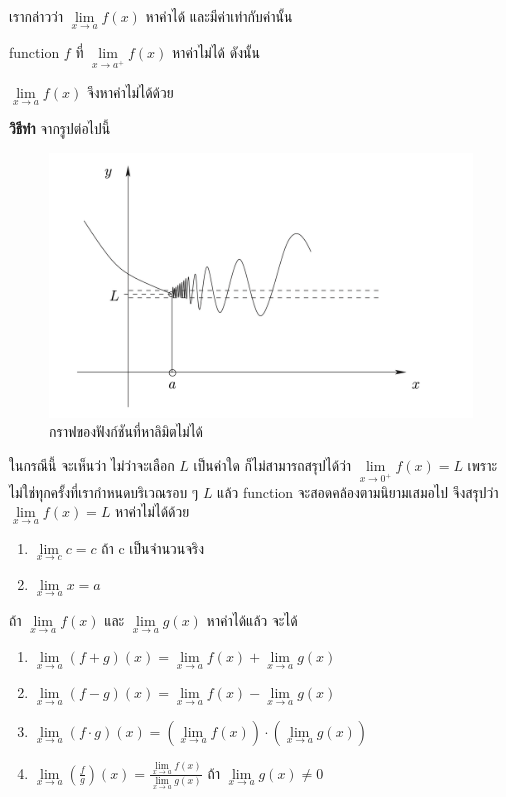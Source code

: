 \documentclass[
]{book}
\begin{document}
เรากล่าวว่า \(\underset{x\rightarrow a}{\lim}f(x)\) หาค่าได้ และมีค่าเท่ากับค่านั้น

\label{ex-limit-2}
function \(f\) ที่ \(\underset{x\rightarrow a^{+}}{\lim}f(x)\) หาค่าไม่ได้
ดังนั้น

\(\underset{x\rightarrow a}{\lim}f(x)\) จึงหาค่าไม่ได้ด้วย

\textbf{วิธีทำ} จากรูปต่อไปนี้

\begin{figure}

{\centering \includegraphics[width=0.5\linewidth]{images/fig-limit-1} 

}

\caption{กราฟของฟังก์ชันที่หาลิมิตไม่ได้}\label{fig:fig-limit-1}
\end{figure}

ในกรณีนี้ จะเห็นว่า ไม่ว่าจะเลือก \(L\) เป็นค่าใด ก็ไม่สามารถสรุปได้ว่า
\(\underset{x\rightarrow 0^{+}}{\lim}f(x)=L\)
เพราะไม่ใช่ทุกครั้งที่เรากำหนดบริเวณรอบ ๆ \(L\) แล้ว function
จะสอดคล้องตามนิยามเสมอไป จึงสรุปว่า \(\underset{x\rightarrow a}{\lim}f(x)=L\)
หาค่าไม่ได้ด้วย

\label{thm-limit-1}
\begin{enumerate}
\def\labelenumi{\arabic{enumi}.}
\item
  \(\underset{x\rightarrow c}{\lim}c=c\) ถ้า c เป็นจำนวนจริง
\item
  \(\underset{x\rightarrow a}{\lim}x=a\)
\end{enumerate}

\label{thm-limit-2}
ถ้า \(\underset{x\rightarrow a}{\lim}f(x)\) และ
\(\underset{x\rightarrow a}{\lim}g(x)\) หาค่าได้แล้ว จะได้

\begin{enumerate}
\def\labelenumi{\arabic{enumi}.}
\item
  \(\underset{x\rightarrow a}{\lim}(f+g)(x)=\underset{x\rightarrow a}{\lim}f(x)+\underset{x\rightarrow a}{\lim}g(x)\)
\item
  \(\underset{x\rightarrow a}{\lim}(f-g)(x)=\underset{x\rightarrow a}{\lim}f(x)-\underset{x\rightarrow a}{\lim}g(x)\)
\item
  \(\underset{x\rightarrow a}{\lim}(f\cdot g)(x)=\left( \underset{x\rightarrow a}{\lim}f(x)\right) \cdot \left( \underset{x\rightarrow a}{\lim}g(x)\right)\)
\item
  \(\underset{x\rightarrow a}{\lim}\left( \frac{f}{g}\right) (x)=\frac{\underset{x\rightarrow a}{\lim}f(x)}{\underset{x\rightarrow a}{\lim}g(x)}\)
  ถ้า \(\underset{x\rightarrow a}{\lim}g(x)\neq 0\)
\end{enumerate}
\end{document}
